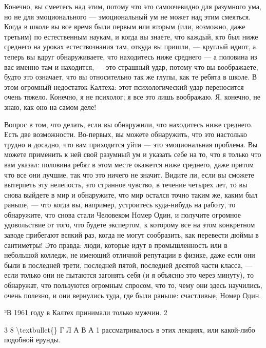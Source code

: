 \documentclass[10pt,oneside]{article}
\begin{document}
Конечно, вы смеетесь над этим, потому что это самоочевидно для разумного ума, но не для эмоционального --- эмоциональный ум не может над этим смеяться. Когда в школе вы все время были первым или вторым (или, возможно, даже третьим) по естественным наукам, и когда вы знаете, что каждый, кто был ниже среднего на уроках естествознания там, откуда вы пришли, --- круглый идиот, а теперь вы вдруг обнаруживаете, что находитесь ниже среднего --- а половина из вас именно там и находится, --- это страшный удар, потому что вы воображаете, будто это означает, что вы относительно так же глупы, как те ребята в школе. В этом огромный недостаток Калтеха: этот психологический удар переносится очень тяжело. Конечно, я не психолог; я все это лишь воображаю. Я, конечно, не знаю, как оно на самом деле!\par

Вопрос в том, что делать, если вы обнаружили, что находитесь ниже среднего. Есть две возможности. Во-первых, вы можете обнаружить, что это настолько трудно и досадно, что вам приходится уйти --- это эмоциональная проблема. Вы можете применить к ней свой разумный ум и указать себе на то, что я только что вам указал: половина ребят в этом месте окажется ниже среднего, даже притом что все они лучшие, так что это ничего не значит. Видите ли, если вы сможете вытерпеть эту нелепость, это странное чувство, в течение четырех лет, то вы снова выйдете в мир и обнаружите, что мир остался точно таким же, каким был раньше, --- что когда вы, например, устроитесь куда-нибудь на работу, то обнаружите, что снова стали Человеком Номер Один, и получите огромное удовольствие от того, что будете экспертом, к которому все на этом конкретном заводе прибегают всякий раз, когда не могут сообразить, как перевести дюймы в сантиметры! Это правда: люди, которые идут в промышленность или в небольшой колледж, не имеющий отличной репутации в физике, даже если они были в последней трети, последней пятой, последней десятой части класса, --- если только они не пытаются загонять себя (и я объясню это через минуту), то обнаружат, что пользуются огромным спросом, что то, чему они здесь научились, очень полезно, и они вернулись туда, где были раньше: счастливые, Номер Один.\par

²В 1961 году в Калтех принимали только мужчин. 2\par

3 8 \textbackslash{}textbullet\{\} Г Л А В А  1 рассматривалось в этих лекциях, или какой-либо подобной ерунды.\par
\end{document}
